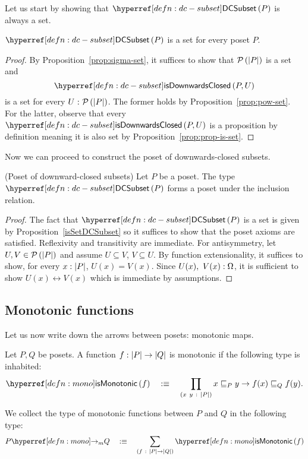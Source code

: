 Let us start by showing that $\dcsubset{P}$ is always a set.
\begin{prop}\label{isSetDCSubset}
  $\dcsubset{P}$ is a set for every poset $P$.
\end{prop}
\begin{proof}
  By Proposition~\ref{prop:sigma-set}, it suffices to show that $\mathcal{P}\left(\left| P \right|\right)$ is a set
  and $$\isdc{P, U}$$ is a set for every $U\hspace{0.1mm}:\hspace{0.1mm}\mathcal{P}\left(\left| P \right|\right)$. The former holds by
  Proposition~\ref{prop:pow-set}. For the latter, observe that every $\isdc{P, U}$ is a
  proposition by definition meaning it is also set by Proposition~\ref{prop:prop-is-set}.
\end{proof}

Now we can proceed to construct the poset of downwards-closed subsets.
\begin{prop}(Poset of downward-closed subsets)\label{prop:dc-poset}
  Let $P$ be a poset. The type $\dcsubset{P}$ forms a poset under the
  inclusion relation.
\end{prop}
\begin{proof}
  The fact that $\dcsubset{P}$ is a set is given by Proposition~\ref{isSetDCSubset} so it
  suffices to show that the poset axioms are satisfied. Reflexivity and transitivity are
  immediate. For antisymmetry, let $U, V \in \mathcal{P}\left(\left| P \right|\right)$ and assume $U \subseteq V$, $V \subseteq U$. By
  function extensionality, it suffices to show, for every $x : \left| P \right|$, $U(x) = V(x)$.
  Since $U(x),~V(x):\Omega$, it is sufficient to show $U(x) \leftrightarrow V(x)$ which is
  immediate by assumptions.
\end{proof}

\subsection{Monotonic functions}

Let us now write down the arrows between posets: monotonic maps.
\begin{defn}\label{defn:mono}
  Let $P, Q$ be posets. A function $f : \left| P \right| \rightarrow \left| Q \right|$ is monotonic if the following
  type is inhabited:
  \begin{equation*}
    \ismonotonic{f} \quad\is\quad \pity{x~y}{\abs{P}}{x \sqsubseteq_P y \rightarrow f(x) \sqsubseteq_Q f(y)}.
  \end{equation*}

  We collect the type of monotonic functions between $P$ and $Q$ in the following type:
  \begin{equation*}
    \mono{P}{Q} \quad\is\quad \sigmaty{f}{\abs{P} \rightarrow \abs{Q}}{\ismonotonic{f}}
  \end{equation*}
\end{defn}


